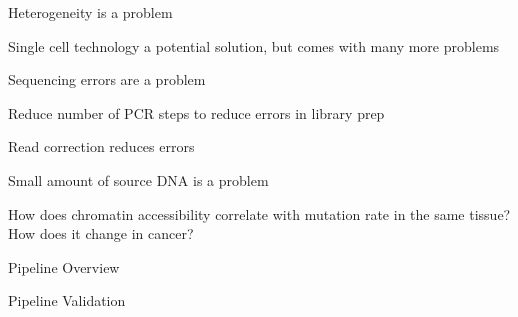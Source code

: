 \documentclass{beamer}
\begin{document}

\begin{frame}{Heterogeneity is a problem}
\end{frame}

\begin{frame}{Single cell technology a potential solution, but comes with many more problems}
\end{frame}

\begin{frame}{Sequencing errors are a problem}
\end{frame}

\begin{frame}{Reduce number of PCR steps to reduce errors in library prep}
\end{frame}

\begin{frame}{Read correction reduces errors}
\end{frame}

\begin{frame}{Small amount of source DNA is a problem}
\end{frame}


\begin{frame}{How does chromatin accessibility correlate with mutation rate in the same tissue? How does it change in cancer?}
\end{frame}


\begin{frame}{Pipeline Overview}
\end{frame}

\begin{frame}{Pipeline Validation}
\end{frame}

\begin{frame}{}
\end{frame}

\begin{frame}{}
\end{frame}

\begin{frame}{}
\end{frame}

\begin{frame}{}
\end{frame}
\end{document}
